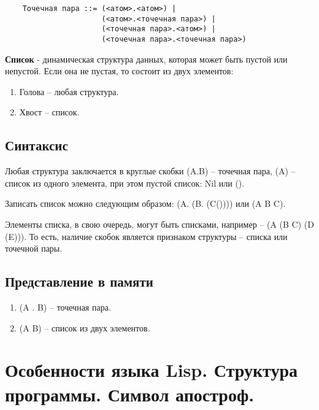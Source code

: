 \begin{lstlisting}
	Точечная пара ::= (<атом>.<атом>) |
					  (<атом>.<точечная пара>) |
					  (<точечная пара>.<атом>) |
					  (<точечная пара>.<точечная пара>)	
\end{lstlisting}


\textbf{Список} - динамическая структура данных, которая может быть
пустой или непустой. Если она не пустая, то состоит из двух элементов:

\begin{enumerate}
	\item Голова -- любая структура.
	\item Хвост -- список.
\end{enumerate}


\subsection{Синтаксис}

Любая структура заключается в круглые скобки (A.B) -- точечная пара, (A) -- список из одного элемента, при этом пустой список: Nil или ().

Записать список можно следующим образом: (A. (B. (C()))) или (A B C). 

Элементы списка, в свою очередь, могут быть списками, например -- (A (B C) (D (E))). То есть, наличие скобок является признаком структуры -- списка или точечной пары.

\subsection{Представление в памяти}

\begin{enumerate}
	\item (A . B) -- точечная пара.


	\item (A B) -- список из двух элементов.


\end{enumerate}


\section{Особенности языка Lisp. Структура программы. Символ апостроф.}

